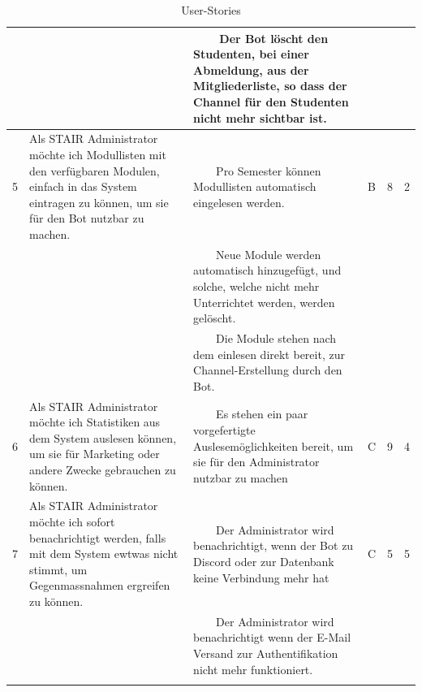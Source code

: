 \documentclass[a4paper, table]{article}
\newcommand{\tabitem}{~~\llap{\textbullet}~~}
\begin{document}
\begin{longtable}{ | p{1em} | p{16em} | p{13em} | p{2em} | p{3em} | p{2em} |}
     & & \tabitem Der Bot löscht den Studenten, bei einer Abmeldung, aus der Mitgliederliste,
     so dass der Channel für den Studenten nicht mehr sichtbar ist. & & & \\
    \hline
    5 & Als STAIR Administrator möchte ich Modullisten mit den verfügbaren Modulen, einfach in das System eintragen zu können,
    um sie für den Bot nutzbar zu machen. &
    \tabitem Pro Semester können Modullisten automatisch eingelesen werden. & B & 8 & 2 \\*
     & & \tabitem Neue Module werden automatisch hinzugefügt, und solche, welche nicht mehr Unterrichtet werden, werden gelöscht. & & & \\*
     & & \tabitem Die Module stehen nach dem einlesen direkt bereit, zur Channel-Erstellung durch den Bot. & & & \\
    \hline
    6 & Als STAIR Administrator möchte ich Statistiken aus dem System auslesen können,
    um sie für Marketing oder andere Zwecke gebrauchen zu können. &
    \tabitem Es stehen ein paar vorgefertigte Auslesemöglichkeiten bereit, um sie für den Administrator nutzbar zu machen & C & 9 & 4 \\
    \hline
    7 & Als STAIR Administrator möchte ich sofort benachrichtigt werden, falls mit dem System ewtwas nicht stimmt,
    um Gegenmassnahmen ergreifen zu können. &
    \tabitem Der Administrator wird benachrichtigt, wenn der Bot zu Discord oder zur Datenbank keine Verbindung mehr hat & C & 5 & 5 \\*
     & & \tabitem Der Administrator wird benachrichtigt wenn der E-Mail Versand zur Authentifikation nicht mehr funktioniert. & & & \\
    \hline
    \caption{User-Stories}
    \label{tab: UserStories}
\end{longtable}
\end{document}
